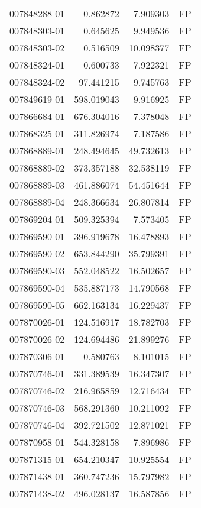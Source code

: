 \begin{tabular}{lrrl}
007848288-01 &    0.862872 &     7.909303 &   FP \\
007848303-01 &    0.645625 &     9.949536 &   FP \\
007848303-02 &    0.516509 &    10.098377 &   FP \\
007848324-01 &    0.600733 &     7.922321 &   FP \\
007848324-02 &   97.441215 &     9.745763 &   FP \\
007849619-01 &  598.019043 &     9.916925 &   FP \\
007866684-01 &  676.304016 &     7.378048 &   FP \\
007868325-01 &  311.826974 &     7.187586 &   FP \\
007868889-01 &  248.494645 &    49.732613 &   FP \\
007868889-02 &  373.357188 &    32.538119 &   FP \\
007868889-03 &  461.886074 &    54.451644 &   FP \\
007868889-04 &  248.366634 &    26.807814 &   FP \\
007869204-01 &  509.325394 &     7.573405 &   FP \\
007869590-01 &  396.919678 &    16.478893 &   FP \\
007869590-02 &  653.844290 &    35.799391 &   FP \\
007869590-03 &  552.048522 &    16.502657 &   FP \\
007869590-04 &  535.887173 &    14.790568 &   FP \\
007869590-05 &  662.163134 &    16.229437 &   FP \\
007870026-01 &  124.516917 &    18.782703 &   FP \\
007870026-02 &  124.694486 &    21.899276 &   FP \\
007870306-01 &    0.580763 &     8.101015 &   FP \\
007870746-01 &  331.389539 &    16.347307 &   FP \\
007870746-02 &  216.965859 &    12.716434 &   FP \\
007870746-03 &  568.291360 &    10.211092 &   FP \\
007870746-04 &  392.721502 &    12.871021 &   FP \\
007870958-01 &  544.328158 &     7.896986 &   FP \\
007871315-01 &  654.210347 &    10.925554 &   FP \\
007871438-01 &  360.747236 &    15.797982 &   FP \\
007871438-02 &  496.028137 &    16.587856 &   FP \\

\end{tabular}
